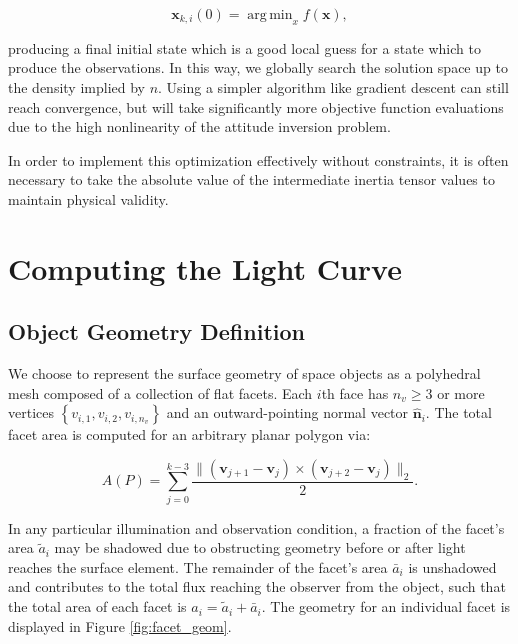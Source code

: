\documentclass[a4paper,twocolumn]{spaceDebrisC} %
\newcommand{\vctr}[1]{\bm{#1}}
\newcommand{\unitv}[1]{\hat{\vctr{#1}}}
\DeclareMathOperator*{\argmin}{arg\,min}
\begin{document}
\begin{equation} \label{eq:opt_problem}
  \vctr{x}_{k,i}(0) = \argmin_x f(\vctr{x}),
\end{equation}

\noindent
producing a final initial state which is a good local guess for a state which to produce the observations. In this way, we globally search the solution space up to the density implied by $n$. Using a simpler algorithm like gradient descent can still reach convergence, but will take significantly more objective function evaluations due to the high nonlinearity of the attitude inversion problem.

In order to implement this optimization effectively without constraints, it is often necessary to take the absolute value of the intermediate inertia tensor values to maintain physical validity. 

\section{Computing the Light Curve}

\subsection{Object Geometry Definition}

We choose to represent the surface geometry of space objects as a polyhedral mesh composed of a collection of flat facets. Each $i$th face has $n_v \geq 3$ or more vertices $\left\{ v_{i,1}, v_{i,2}, v_{i,n_v} \right\}$ and an outward-pointing normal vector $\unitv{n}_i$. The total facet area is computed for an arbitrary planar polygon via:

\begin{equation} \label{eq:poly_area}
 A(P) = \sum_{j=0}^{k-3} \frac{\| \left( \vctr{v}_{j+1} - \vctr{v}_{j} \right) \times \left( \vctr{v}_{j+2} - \vctr{v}_{j} \right)\|_2}{2}.
 \end{equation} 
 
 In any particular illumination and observation condition, a fraction of the facet's area $\tilde{a}_i$ may be shadowed due to obstructing geometry before or after light reaches the surface element. The remainder of the facet's area $\bar{a}_i$ is unshadowed and contributes to the total flux reaching the observer from the object, such that the total area of each facet is $a_i = \tilde{a}_i + \bar{a}_i$. The geometry for an individual facet is displayed in Figure \ref{fig:facet_geom}.
\end{document}
